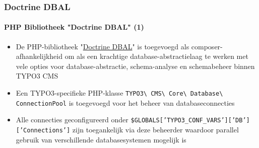 \begin{frame}[fragile]
	\frametitle{Doctrine DBAL}
	\framesubtitle{PHP Bibliotheek "Doctrine DBAL" (1)}

	\begin{itemize}

		\item De PHP-bibliotheek
			"\href{http://www.doctrine-project.org}{Doctrine DBAL}"
			is toegevoegd als composer-afhankelijkheid
			om als een krachtige database-abstractielaag te werken met vele opties
			voor database-abstractie, schema-analyse en schemabeheer binnen
			TYPO3 CMS

		\item Een TYPO3-specifieke PHP-klasse
			\texttt{TYPO3\textbackslash
				CMS\textbackslash
				Core\textbackslash
				Database\textbackslash
				ConnectionPool}\newline
			is toegevoegd voor het beheer van databaseconnecties

		\item Alle connecties geconfigureerd onder
			\texttt{\$GLOBALS['TYPO3\_CONF\_VARS']['DB']['Connections']}\newline
			zijn toegankelijk via deze beheerder waardoor parallel gebruik van
			verschillende databasesystemen mogelijk is

	\end{itemize}

\end{frame}

